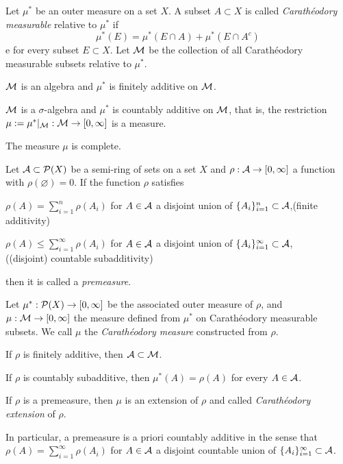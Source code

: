 \documentclass{../note}
\begin{document}
\begin{prb}
Let $\mu^*$ be an outer measure on a set $X$.
A subset $A\subset X$ is called \emph{Carath\'eodory measurable} relative to $\mu^*$ if
\[\mu^*(E)=\mu^*(E\cap A)+\mu^*(E\cap A^c)\]e
for every subset $E\subset X$.
Let $\mathcal{M}$ be the collection of all Carath\'eodory measurable subsets relative to $\mu^*$.
\begin{parts}
\item $\mathcal{M}$ is an algebra and $\mu^*$ is finitely additive on $\mathcal{M}$.
\item $\mathcal{M}$ is a $\sigma$-algebra and $\mu^*$ is countably additive on $\mathcal{M}$, that is, the restriction $\mu:=\mu^*|_{\mathcal{M}}:\mathcal{M}\to[0,\infty]$ is a measure.
\item The measure $\mu$ is complete.
\end{parts}
\end{prb}

\begin{prb}
Let $\mathcal{A}\subset\mathcal{P}(X)$ be a semi-ring of sets on a set $X$ and $\rho:\mathcal{A}\to[0,\infty]$ a function with $\rho(\varnothing)=0$.
If the function $\rho$ satisfies
\begin{parts}[(i)]
\item $\rho(A)=\sum_{i=1}^n\rho(A_i)$ for $A\in\mathcal{A}$ a disjoint union of $\{A_i\}_{i=1}^n\subset\mathcal{A}$,\hfill(finite additivity)
\item $\rho(A)\le\sum_{i=1}^\infty\rho(A_i)$ for $A\in\mathcal{A}$ a disjoint union of $\{A_i\}_{i=1}^\infty\subset\mathcal{A}$,\\\null\hfill((disjoint) countable subadditivity)
\end{parts}
then it is called a \emph{premeasure}.

Let $\mu^*:\mathcal{P}(X)\to[0,\infty]$ be the associated outer measure of $\rho$, and $\mu:\mathcal{M}\to[0,\infty]$ the measure defined from $\mu^*$ on Carath\'eodory measurable subsets.
We call $\mu$ the \emph{Carath\'eodory measure} constructed from $\rho$.
\begin{parts}
\item If $\rho$ is finitely additive, then $\mathcal{A}\subset\mathcal{M}$.
\item If $\rho$ is countably subadditive, then $\mu^*(A)=\rho(A)$ for every $A\in\mathcal{A}$.
\item If $\rho$ is a premeasure, then $\mu$ is an extension of $\rho$ and called \emph{Carath\'eodory extension} of $\rho$.
\item In particular, a premeasure is a priori countably additive in the sense that $\rho(A)=\sum_{i=1}^\infty\rho(A_i)$ for $A\in\mathcal{A}$ a disjoint countable union of $\{A_i\}_{i=1}^\infty\subset\mathcal{A}$.
\end{parts}
\end{prb}
\end{document}
